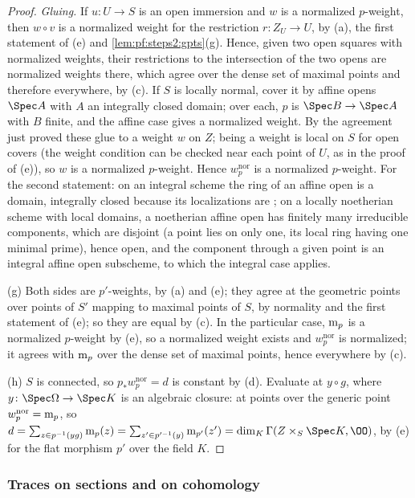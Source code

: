 \begin{proof}
\emph{Gluing.} If $u\colon U\to S$ is an open immersion and $w$ is a normalized $p$-weight, then
$w\circ v$ is a normalized weight for the restriction $r\colon Z_U\to U$, by (a), the first statement
of (e) and \cref{lem:pf:steps2:gpts}(g). Hence, given two open squares with normalized weights, their
restrictions to the intersection of the two opens are normalized weights there, which agree over the
dense set of maximal points and therefore everywhere, by (c). If $S$ is locally normal, cover it by
affine opens $\Spec A$ with $A$ an integrally closed domain; over each, $p$ is $\Spec B\to\Spec A$ with
$B$ finite, and the affine case gives a normalized weight. By the agreement just proved these glue to a
weight $w$ on $Z$; being a weight is local on $S$ for open covers (the weight condition can be checked
near each point of $U$, as in the proof of (e)), so $w$ is a normalized $p$-weight. Hence
$w^{\mathrm{nor}}_p$ is a normalized $p$-weight. For the second statement: on an integral scheme the ring
of an affine open is a domain, integrally closed because its localizations are
\cite[Prop.~5.13]{AtiyahMacdonald1969}; on a locally noetherian scheme with local domains, a
noetherian affine open has finitely many irreducible components, which are disjoint (a point lies on
only one, its local ring having one minimal prime), hence open, and the component through a given point
is an integral affine open subscheme, to which the integral case applies.

(g) Both sides are $p'$-weights, by (a) and (e); they agree at the geometric points over points of $S'$
mapping to maximal points of $S$, by normality and the first statement of (e); so they are equal by
(c). In the particular case, $\mathrm{m}_p$ is a normalized $p$-weight by (e), so a normalized weight
exists and $w^{\mathrm{nor}}_p$ is normalized; it agrees with $\mathrm{m}_p$ over the dense set of maximal
points, hence everywhere by (c).

(h) $S$ is connected, so $p_\ast w^{\mathrm{nor}}_p=d$ is constant by (d). Evaluate at $y\circ g$, where
$y\colon\Spec\Omega\to\Spec K$ is an algebraic closure: at points over the generic point
$w^{\mathrm{nor}}_p=\mathrm{m}_p$, so $d=\sum_{z\in p^{-1}(yg)}\stepsiim_p(z)=\sum_{z'\in p'^{-1}(y)}
\stepsiim_{p'}(z')=\dim_K\Gamma(Z\times_S\Spec K,\OO)$, by (e) for the flat morphism $p'$ over the field
$K$.
\end{proof}

\subsubsection{Traces on sections and on cohomology}

